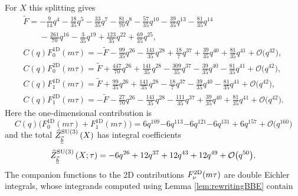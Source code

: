 \documentclass[pdftex]{sigma}
\newcommand{\Zhlong}[3]{\ensuremath{\widehat{Z}^{#1}_{#2}\left(#3;\tau\right)}}
\newcommand{\Zhshort}[3]{\ensuremath{\widehat{Z}^{#1}_{#2}\left(#3\right)}}
\theoremstyle{definition}
\numberwithin{equation}{section}
\begin{document}
For $X$ this splitting gives
\begin{gather*}%
\tilde{F}= -\frac{9}{14} q^{4} -\frac{18}{35} q^{5} -\frac{33}{35} q^{7} -\frac{81}{70} q^{8} -\frac{57}{35} q^{10} -\frac{39}{35} q^{13} -\frac{81}{35} q^{14} \\
\phantom{\tilde{F}= }{}-\frac{261}{70} q^{16} -\frac{3}{35} q^{19} + \frac{123}{35} q^{22} + \frac{69}{35} q^{25}, \\
C(q)F_{0}^{\text{1D}} (m\tau ) = -\tilde{F}-\frac{99}{35} q^{26} - \frac{141}{35} q^{28} +\frac{18}{7} q^{37} +\frac{39}{35} q^{40} +\frac{81}{35} q^{41} + \mathcal{O}\bigl(q^{42} \bigr),\\
C(q)F_{0}^{\text{2D}} (m\tau ) = \tilde{F}+\frac{447}{70} q^{26} +\frac{141}{35} q^{28} - \frac{309}{35} q^{37} - \frac{39}{35} q^{40} - \frac{81}{35} q^{41} + \mathcal{O} \bigl(q^{42} \bigr),\\
C(q)F_{1}^{\text{1D}} (m\tau )= \tilde{F}+\frac{99}{35} q^{26} +\frac{141}{35} q^{28} - \frac{18}{7} q^{37} - \frac{39}{35} q^{40} - \frac{81}{35} q^{41} + \mathcal{O} \bigl(q^{42} \bigr),\\
C(q)F_{1}^{\text{2D}} (m\tau ) = -\tilde{F}-\frac{27}{70} q^{26} - \frac{141}{35} q^{28} - \frac{111}{35} q^{37} +\frac{39}{35} q^{40} +\frac{81}{35} q^{41} + \mathcal{O} \bigl(q^{42} \bigr) .
\end{gather*}
Here the one-dimensional contribution is
\[
 C(q) \bigl(F_{0}^{\text{1D}} (m\tau ) + F_{1}^{\text{1D}} (m\tau ) \bigr)=6 q^{109} {-6} q^{113} {-6} q^{121} {-6} q^{131} + 6 q^{157} + \mathcal{O} \bigl(q^{160} \bigr)
\]
and the total $\Zhshort{{\rm SU}(3)}{\vec{\underline{b}}}{X}$ has integral coefficients
\[
\Zhlong{{\rm SU}(3)}{\vec{\underline{b}}}{X} ={-6} q^{26} + 12 q^{37} + 12 q^{43} + 12 q^{49} + \mathcal{O}\bigl(q^{50}\bigr).
\]
The companion functions to the 2D contributions $F_{\nu}^{2\rm D}(m\tau)$ are double Eichler integrals, whose integrands computed using Lemma \ref{lem:rewritingBBE} contain
\end{document}

